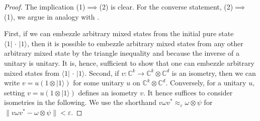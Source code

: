 \documentclass[a4paper, 10pt, onecolumn, accepted=2025-07-22]{quantumarticle}
\theoremstyle{definition}
\newcommand{\ket}[1]{|#1\rangle}
\newcommand{\bra}[1]{\langle#1|}
\newcommand{\norm}[1]{\lVert #1\rVert}
\newcommand{\ox}{\otimes}
\newcommand{\eps}{\varepsilon}
\def\CC{{\mathbb C}}
\newcommand*{\1}{\text{\usefont{U}{bbold}{m}{n}1}}
\newcommand{\placeholder}[0]{{\,\cdot\,}}
\begin{document}
\begin{proof}
The implication (1)$\implies$(2) is clear. For the converse statement, (2)$\implies$(1), we argue in analogy with \cite[Cor.~3.3]{haagerup_classification_2009}.

First, if we can embezzle arbitrary mixed states from the initial pure state $\bra1\placeholder\ket1$, then it is possible to embezzle arbitrary mixed states from any other arbitrary mixed state by the triangle inequality and because the inverse of a unitary is unitary. It is, hence, sufficient to show that one can embezzle arbitrary mixed states from $\bra1\placeholder\ket1$.
Second, if $v: \CC^k \to \CC^k\ox \CC^d$ is an isometry, then we can write $v = u(1\ox \ket1)$ for some unitary $u$ on $\CC^k\ox \CC^d$. Conversely, for a unitary $u$, setting $v=u(1\ox \ket1)$ defines an isometry $v$. It hence suffices to consider isometries in the following. We use the shorthand $v\omega v^{*}\approx_{\eps}\omega\ox\psi$ for $\norm{v\omega v^{*}-\omega\ox\psi}  < \eps$.


\end{proof}
\end{document}

